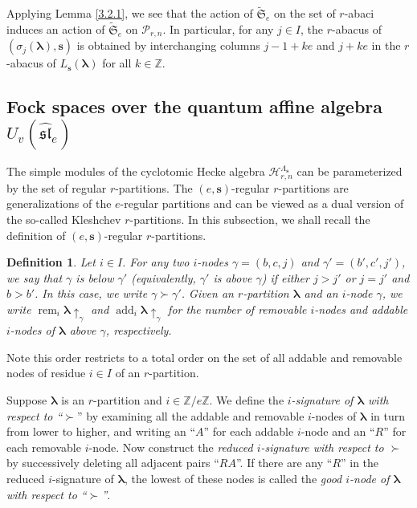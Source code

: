 \documentclass[a4paper,10pt]{amsart}
\theoremstyle{plain}
\renewcommand{\H}{\mathcal{H}}
\def\bs{{\boldsymbol{s}}}
\def\Z{{\mathbb Z}}
\def\Lam{\Lambda}
\def\PP{\mathscr{P}}
\def\blam{{\boldsymbol \lambda}}
\newcommand{\add}{\operatorname{add}}
\newcommand{\rem}{\operatorname{rem}}
\def\Sym{\mathfrak{S}}
\theoremstyle{plain}
\newtheorem{dfn}[theorem]{Definition}
\numberwithin{equation}{section}
\begin{document}
Applying Lemma \ref{3.2.1}, we see that the action of $\widetilde{\Sym}_e$ on the set of $r$-abaci induces an action of $\widetilde{\Sym}_e$ on $\PP_{r,n}$. In particular, for any $j\in I$,
the $r$-abacus of $(\sigma_j(\blam),\bs)$ is obtained by interchanging columns $j-1+ke$ and $j+ke$ in the $r$-abacus of $L_\bs(\blam)$ for all $k\in \Z$.

\medskip
\subsection{Fock spaces over the quantum affine algebra $U_v(\widehat{\mathfrak{sl}}_e)$}

The simple modules of the cyclotomic Hecke algebra $\H_{r,n}^{\Lam_{\bs}}$ can be parameterized by the set of regular $r$-partitions. The $(e,\bs)$-regular $r$-partitions are generalizations of the $e$-regular partitions and can be viewed as a dual version of the so-called Kleshchev $r$-partitions. In this subsection, we shall recall the definition of $(e,\bs)$-regular $r$-partitions.

\begin{dfn} Let $i\in I$. For any two $i$-nodes $\gamma=(b,c,j)$ and $\gamma'=(b',c',j')$, we say that $\gamma$ is below $\gamma'$ (equivalently, $\gamma'$ is above $\gamma$) if either $j>j'$ or $j=j'$ and $b>b'$. In this case, we write $\gamma\succ\gamma'$. Given an $r$-partition $\blam$ and an $i$-node $\gamma$, we write $\rem_{i}{\blam}\uparrow_\gamma$ and $\add_{i}{\blam} \uparrow_\gamma$ for the number of removable $i$-nodes  and addable $i$-nodes of $\blam$ above $\gamma$, respectively.
\end{dfn}
Note this order restricts to a total order on the set of all addable and removable nodes of residue $i \in I$ of an $r$-partition.

Suppose $\blam$ is an $r$-partition and $i \in\Z/e\Z$. We define the \emph{$i$-signature of $\blam$ with respect to ``$\succ$}'' by examining all the addable and removable $i$-nodes of $\blam$ in turn from lower to higher, and writing an ``$A$'' for each addable $i$-node and an ``$R$'' for each removable $i$-node. Now construct the \emph{reduced $i$-signature with respect to $\succ$} by successively deleting all adjacent pairs ``$RA$''. If there are any ``$R$'' in the reduced $i$-signature of $\blam$, the lowest of these nodes is called the \emph{good $i$-node of $\blam$ with respect to ``$\succ$''}.

\end{document}
